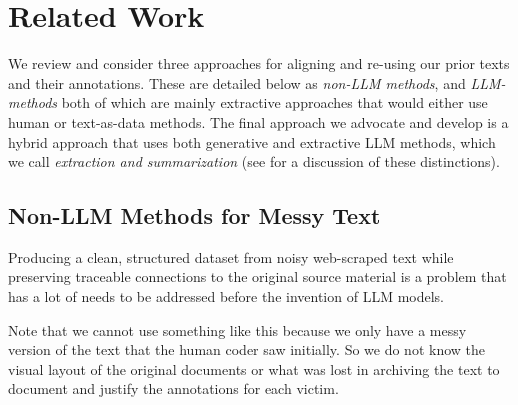 \documentclass{article}
\begin{document}


\section{Related Work}\label{related-work}

We review and consider three approaches for aligning and re-using our prior texts and their annotations.  These are detailed below as \emph{non-LLM methods}, and \emph{LLM-methods} both of which are mainly extractive approaches that would either use human or text-as-data methods.  The final approach we advocate and develop is a hybrid approach that uses both generative and extractive LLM methods, which we call \emph{extraction and summarization} (see \cite{Brandt_etal2025} for a discussion of these distinctions). 

\subsection{Non-LLM Methods for Messy
Text}\label{non-llm-methods-for-messy-text}

Producing a clean, structured dataset from noisy web-scraped text while preserving traceable connections to the original source material is a problem that has a lot of needs to be addressed before the invention of LLM models.

Note that we cannot use something like this because we only have a messy version of the text that the human coder saw initially.  So we do not know the visual layout of the original documents or what was lost in archiving the text to document and justify the annotations for each victim.
\end{document}
